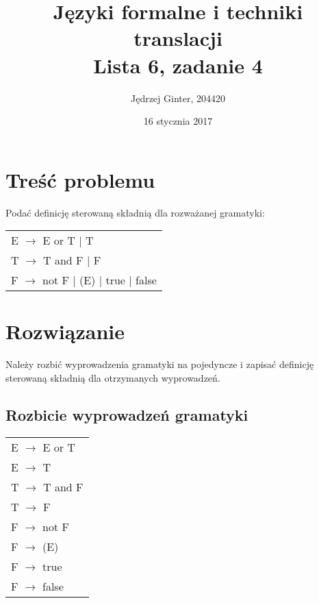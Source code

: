 \documentclass[10pt,a4paper]{article}
\begin{document}
\title{%
	Języki formalne i techniki translacji\\
	\large Lista 6, zadanie 4}
\author{Jędrzej Ginter, 204420}
\date{16 stycznia 2017}
\maketitle

\section{Treść problemu}
Podać definicję sterowaną składnią dla rozważanej gramatyki:\\

{\renewcommand{\arraystretch}{1.25}%
	\begin{adjustbox}{center}
		\begin{tabular}{l}
			E $\rightarrow$ E or T $\vert$ T\\
			T $\rightarrow$ T and F $\vert$ F\\
			F $\rightarrow$ not F $\vert$ (E) $\vert$ true $\vert$ false\\
		\end{tabular}
	\end{adjustbox}
}\quad

\section{Rozwiązanie}
Należy rozbić wyprowadzenia gramatyki na pojedyncze i zapisać definicję sterowaną składnią dla otrzymanych wyprowadzeń.

\subsection{Rozbicie wyprowadzeń gramatyki}
{\renewcommand{\arraystretch}{1.25}%
	\begin{adjustbox}{center}
		\begin{tabular}{l}
			E $\rightarrow$ E or T\\
			E $\rightarrow$ T\\
			T $\rightarrow$ T and F\\
			T $\rightarrow$ F\\
			F $\rightarrow$ not F\\
			F $\rightarrow$ (E)\\
			F $\rightarrow$ true\\
			F $\rightarrow$ false\\
	\end{tabular}
	\end{adjustbox}
}\quad
\end{document}
